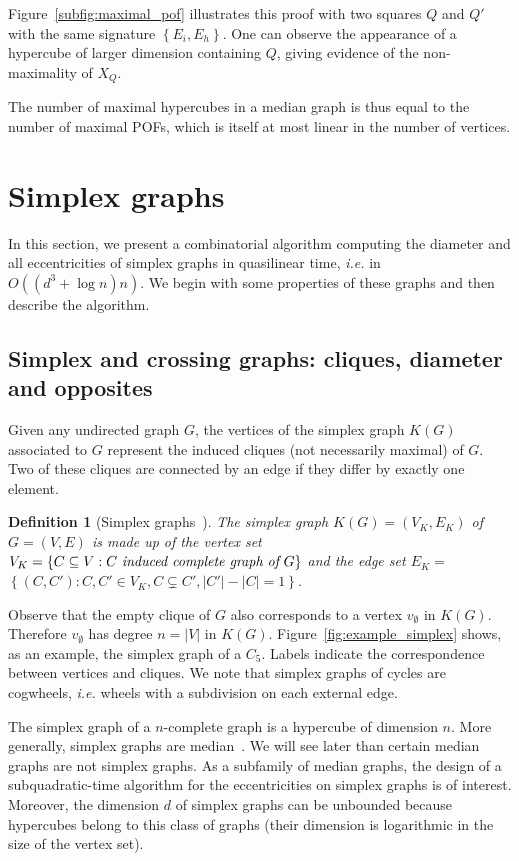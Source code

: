 \documentclass{article}
\newtheorem{definition}{Definition}
\newcommand{\set}[1]{\left\{ #1 \right\}}
\newcommand{\card}[1]{\left| #1 \right|}
\begin{document}
Figure~\ref{subfig:maximal_pof} illustrates this proof with two squares $Q$ and $Q'$ with the same signature $\set{E_i,E_h}$. One can observe the appearance of a hypercube of larger dimension containing $Q$, giving evidence of the non-maximality of $X_Q$.

The number of maximal hypercubes in a median graph is thus equal to the number of maximal POFs, which is itself at most linear in the number of vertices.

\section{Simplex graphs} \label{sec:simplex}

In this section, we present a combinatorial algorithm computing the diameter and all eccentricities of simplex graphs in quasilinear time, {\em i.e.} in $O((d^3+\log n)n)$. We begin with some properties of these graphs and then describe the algorithm.

\subsection{Simplex and crossing graphs: cliques, diameter and opposites} \label{subsec:crossing}

Given any undirected graph $G$, the vertices of the simplex graph $K(G)$ associated to $G$ represent the induced cliques (not necessarily maximal) of $G$. Two of these cliques are connected by an edge if they differ by exactly one element.

\begin{definition}[Simplex graphs~\cite{BaVe89}]
The simplex graph $K(G)=(V_K,E_K)$ of $G=(V,E)$ is made up of the vertex set $V_K = \set{C\subseteq V: C ~\emph{induced complete graph of}~ G}$ and the edge set $E_K = $\\ $\set{(C,C') : C,C' \in V_K, C \subsetneq C', \card{C'}-\card{C} = 1}$.
\label{def:simplex}
\end{definition}

Observe that the empty clique of $G$ also corresponds to a vertex $v_{\emptyset}$ in $K(G)$.  Therefore $v_{\emptyset}$ has degree $n = \card{V}$ in $K(G)$. Figure~\ref{fig:example_simplex} shows, as an example, the simplex graph of a $C_5$. Labels indicate the correspondence between vertices and cliques. We note that simplex graphs of cycles are cogwheels, {\em i.e.} wheels with a subdivision on each external edge.

The simplex graph of a $n$-complete graph is a hypercube of dimension $n$. More generally, simplex graphs are median~\cite{BaCh08,BaLeMo86}. We will see later than certain median graphs are not simplex graphs. As a subfamily of median graphs, the design of a subquadratic-time algorithm for the eccentricities on simplex graphs is of interest. Moreover, the dimension $d$ of simplex graphs can be unbounded because hypercubes belong to this class of graphs (their dimension is logarithmic in the size of the vertex set).
\end{document}
